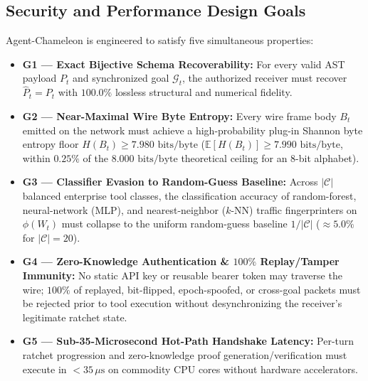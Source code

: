 \documentclass[conference,10pt]{IEEEtran}
\begin{document}
\subsection{Security and Performance Design Goals}
Agent-Chameleon is engineered to satisfy five simultaneous properties:
\begin{itemize}
    \item \textbf{G1 --- Exact Bijective Schema Recoverability:} For every valid AST payload $P_t$ and synchronized goal $\mathcal{G}_t$, the authorized receiver must recover $\hat{P}_t = P_t$ with $100.0\%$ lossless structural and numerical fidelity.
    \item \textbf{G2 --- Near-Maximal Wire Byte Entropy:} Every wire frame body $B_t$ emitted on the network must achieve a high-probability plug-in Shannon byte entropy floor $H(B_t) \ge 7.980\text{ bits/byte}$ ($\mathbb{E}[H(B_t)] \ge 7.990\text{ bits/byte}$, within $0.25\%$ of the $8.000\text{ bits/byte}$ theoretical ceiling for an 8-bit alphabet).
    \item \textbf{G3 --- Classifier Evasion to Random-Guess Baseline:} Across $|\mathcal{C}|$ balanced enterprise tool classes, the classification accuracy of random-forest, neural-network (MLP), and nearest-neighbor ($k$-NN) traffic fingerprinters on $\phi(W_t)$ must collapse to the uniform random-guess baseline $1/|\mathcal{C}|$ ($\approx 5.0\%$ for $|\mathcal{C}| = 20$).
    \item \textbf{G4 --- Zero-Knowledge Authentication \& $100\%$ Replay/Tamper Immunity:} No static API key or reusable bearer token may traverse the wire; $100\%$ of replayed, bit-flipped, epoch-spoofed, or cross-goal packets must be rejected prior to tool execution without desynchronizing the receiver's legitimate ratchet state.
    \item \textbf{G5 --- Sub-35-Microsecond Hot-Path Handshake Latency:} Per-turn ratchet progression and zero-knowledge proof generation/verification must execute in $< 35\,\mu\text{s}$ on commodity CPU cores without hardware accelerators.
\end{itemize}
\end{document}
